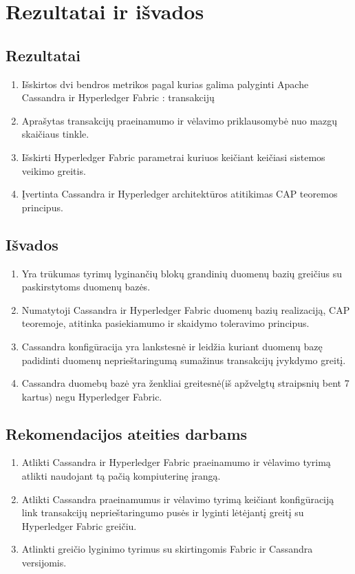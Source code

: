 \documentclass{VUMIFPSkursinis}
\begin{document}
\pagebreak
\section{Rezultatai ir išvados}
\thispagestyle{empty} 
\subsection{Rezultatai}
\begin{enumerate}
\item{Išskirtos dvi bendros metrikos pagal kurias galima palyginti Apache Cassandra ir Hyperledger Fabric : transakcijų }
\item{Aprašytas transakcijų praeinamumo ir vėlavimo priklausomybė nuo mazgų skaičiaus tinkle.}
\item{Išskirti Hyperledger Fabric parametrai kuriuos keičiant keičiasi sistemos veikimo greitis.}
\item{Įvertinta Cassandra ir Hyperledger architektūros atitikimas CAP teoremos principus.}
\end{enumerate}
\subsection{Išvados}
\begin{enumerate}
\item{Yra trūkumas tyrimų lyginančių blokų grandinių duomenų bazių greičius su paskirstytoms duomenų bazės.}
\item{Numatytoji Cassandra ir Hyperledger Fabric duomenų bazių realizaciją, CAP teoremoje, atitinka pasiekiamumo ir skaidymo toleravimo principus.}
\item{Cassandra konfigūracija yra lankstesnė ir leidžia kuriant duomenų bazę padidinti duomenų neprieštaringumą sumažinus transakcijų įvykdymo greitį.}
\item{Cassandra duomebų bazė yra ženkliai greitesnė(iš apžvelgtų straipsnių bent 7 kartus) negu Hyperledger Fabric.}
\end{enumerate}
\subsection{Rekomendacijos ateities darbams}
\begin{enumerate}
\item{Atlikti Cassandra ir Hyperledger Fabric praeinamumo ir vėlavimo tyrimą atlikti naudojant tą pačią kompiuterinę įrangą.}
\item{Atlikti Cassandra praeinamumus ir vėlavimo tyrimą keičiant konfigūraciją link transakcijų neprieštaringumo pusės ir lyginti lėtėjantį greitį su Hyperledger Fabric greičiu.}
\item{Atlinkti greičio lyginimo tyrimus su skirtingomis Fabric ir Cassandra versijomis.}
\end{enumerate}
\end{document}

